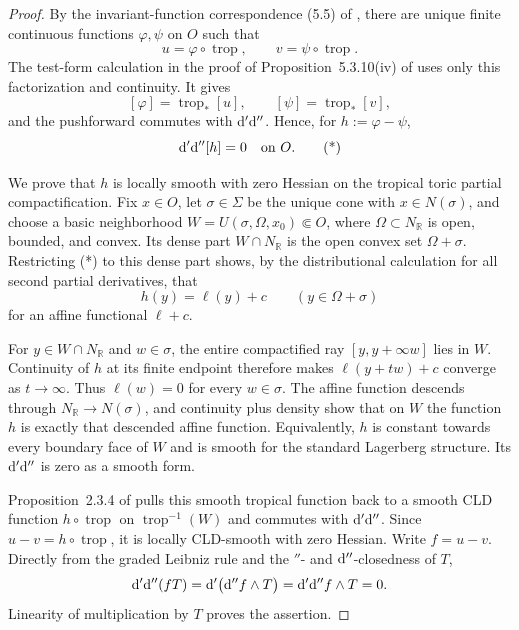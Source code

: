 \begin{proof}
By the invariant-function correspondence (5.5) of \cite{BGJKK25}, there
are unique finite continuous functions $\varphi,\psi$ on $O$ such that
\[
 u=\varphi\circ\operatorname{trop},\qquad
 v=\psi\circ\operatorname{trop}.
\]
The test-form calculation in the proof of Proposition~5.3.10(iv) of
\cite{BGJKK25} uses only this factorization and continuity.  It gives
\[
 [\varphi]=\operatorname{trop}_*[u],\qquad
 [\psi]=\operatorname{trop}_*[v],
\]
and the pushforward commutes with $\mathrm d'\mathrm d''$.  Hence, for
$h:=\varphi-\psi$,
\[
 \mathrm d'\mathrm d''[h]=0\quad\hbox{on }O.
\tag{*}\label{eq:p213-toric-boundary-zero-hessian}
\]

We prove that $h$ is locally smooth with zero Hessian on the tropical toric
partial compactification.  Fix $x\in O$, let $\sigma\in\Sigma$ be the
unique cone with $x\in N(\sigma)$, and choose a basic neighborhood
$W=U(\sigma,\Omega,x_0)\Subset O$, where $\Omega\subset N_{\mathbb R}$
is open, bounded, and convex.  Its dense part $W\cap N_{\mathbb R}$ is the
open convex set $\Omega+\sigma$.  Restricting (*) to this dense part shows,
by the distributional calculation for all second partial derivatives, that
\[
 h(y)=\ell(y)+c\qquad(y\in\Omega+\sigma)
\]
for an affine functional $\ell+c$.

For $y\in W\cap N_{\mathbb R}$ and $w\in\sigma$, the entire compactified
ray $[y,y+\infty w]$ lies in $W$.  Continuity of $h$ at its finite endpoint
therefore makes $\ell(y+tw)+c$ converge as $t\to\infty$.  Thus
$\ell(w)=0$ for every $w\in\sigma$.  The affine function descends through
$N_{\mathbb R}\to N(\sigma)$, and continuity plus density show that on $W$
the function $h$ is exactly that descended affine function.  Equivalently,
$h$ is constant towards every boundary face of $W$ and is smooth for the
standard Lagerberg structure.  Its $\mathrm d'\mathrm d''$ is zero as a smooth
form.

Proposition~2.3.4 of \cite{BGJKK25} pulls this smooth tropical function
back to a smooth CLD function $h\circ\operatorname{trop}$ on
$\operatorname{trop}^{-1}(W)$ and commutes with $\mathrm d'\mathrm d''$.  Since
$u-v=h\circ\operatorname{trop}$, it is locally CLD-smooth with zero
Hessian.  Write $f=u-v$.  Directly from the graded Leibniz rule and the
$\dprime$- and $\mathrm d''$-closedness of $T$,
\[
 \mathrm d'\mathrm d''(fT)
 =\mathrm d'\bigl(\mathrm d'' f\wedge T\bigr)
 =\mathrm d'\mathrm d'' f\wedge T
 =0.
\]
Linearity of multiplication by $T$ proves the assertion.
\end{proof}
